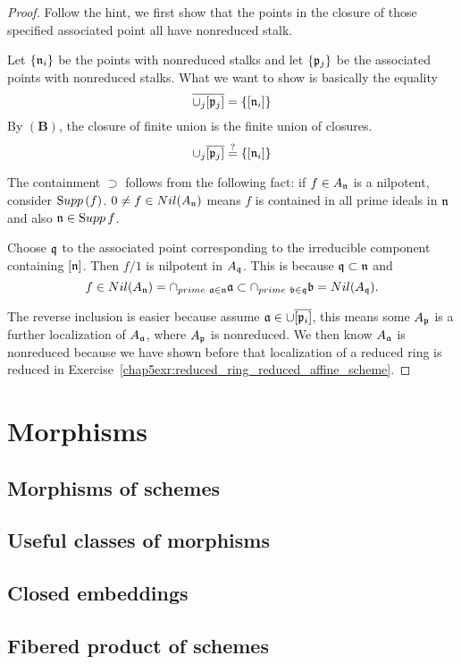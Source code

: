 \documentclass[11pt]{book} %
\begin{document}
\begin{proof}
Follow the hint, we first show that the points in the closure of those specified associated point all have nonreduced stalk.

Let $\{{\mathfrak n}_i\}$ be the points with nonreduced stalks and let $\{{\mathfrak p}_j\}$ be the associated points with nonreduced stalks. What we want to show is basically the equality
$$
\overline{\cup_j [{\mathfrak p}_j]}=\{[{\mathfrak n}_i]\}
$$
By $\mathbf{(B)}$, the closure of finite union is the finite union of closures.
$$
\cup_j \overline{[{\mathfrak p}_j]}\overset{?}{=}\{[{\mathfrak n}_i]\}
$$

The containment $\supset$ follows from the following fact: if $f\in A_{\mathfrak n}$ is a nilpotent, consider ${\text Supp\thinspace}(f)$.
$0\neq f\in Nil(A_{\mathfrak n})$ means $f$ is contained in all prime ideals in ${\mathfrak n}$ and also ${\mathfrak n}\in {\text Supp\thinspace} f$.

Choose $\mathfrak q$ to the associated point corresponding to the irreducible component containing $[{\mathfrak n}]$. Then $f/1$ is nilpotent in $A_\mathfrak q$. This is because $\mathfrak q\subset {\mathfrak n}$ and $$f\in Nil(A_{\mathfrak n})=\cap_{prime\ {\mathfrak a}\in {\mathfrak n}}{\mathfrak a}\subset \cap_{prime\ {\mathfrak b}\in \mathfrak q}{\mathfrak b}=Nil(A_\mathfrak q).$$

The reverse inclusion is easier because assume
${\mathfrak a}\in \cup\overline{[{\mathfrak p}_i]}$, this means some $A_{\mathfrak p}$ is a further localization of $A_{\mathfrak a}$, where $A_{\mathfrak p}$ is nonreduced. We then know $A_{\mathfrak a}$ is nonreduced because we have shown before that localization of a reduced ring is reduced in Exercise~\ref{chap5exr:reduced_ring_reduced_affine_scheme}.
\end{proof}


\part{Morphisms}
\chapter{Morphisms of schemes}
\chapter{Useful classes of morphisms}
\chapter{Closed embeddings}
\chapter{Fibered product of schemes}
\end{document}
